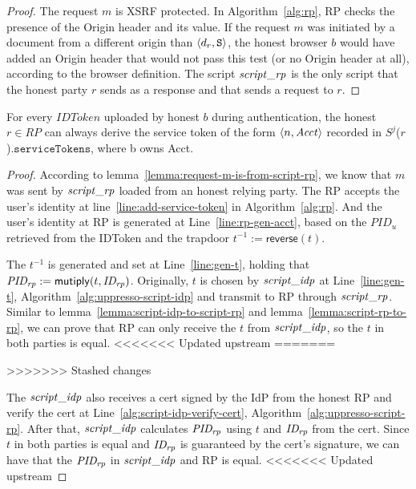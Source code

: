\begin{theorem}
  \begin{proof}
    The request $m$ is XSRF protected. In Algorithm~\ref{alg:rp}, 
    RP checks the presence of the Origin header and its value. 
    If the request $m$ was initiated by a document from a 
    different origin than $\langle d_r, \mathtt{S}\rangle$, the honest browser 
    $b$ would have added an Origin header that would not 
    pass this test (or no Origin header at all), according to 
    the browser definition. The script $\mathit{script\_rp}$ is the 
    only script that the honest party $r$ sends as a response 
    and that sends a request to $r$.
  \end{proof}
  
  \begin{lemma}
    For every $IDToken$ uploaded by honest $b$ during authentication, 
    the honest $r \in RP$ can always derive the service token of the form 
    $\langle {{}n, \mathit{Acct}} \rangle$ recorded in $S^j$($r$).$\mathtt{serviceTokens}$, where b owns Acct. 
  \end{lemma}
  \begin{proof}
    According to lemma~\ref{lemma:request-m-is-from-script-rp}, 
    we know that $m$ was sent by $\mathit{script\_rp}$ loaded from an honest relying party. 
    The RP accepts the user's identity at line~\ref{line:add-service-token} in Algorithm~\ref{alg:rp}.
    And the user's identity at RP is generated at Line~\ref{line:rp-gen-acct}, 
    based on the $PID_u$ retrieved from the IDToken and the trapdoor $t^{-1} := \mathsf{reverse}(t)$. 
    
    The $t^{-1}$ is generated and set at Line~\ref{line:gen-t}, 
    holding that $\mathit{PID_{rp}} := \mathsf{mutiply}(t, \mathit{ID_{rp}})$.
    Originally, $t$ is chosen by $\mathit{script\_idp}$ at Line~\ref{line:gen-t}, Algorithm~\ref{alg:uppresso-script-idp} 
    and transmit to RP through $\mathit{script\_rp}$.
    Similar to lemma~\ref{lemma:script-idp-to-script-rp} and lemma~\ref{lemma:script-rp-to-rp}, 
    we can prove that RP can only receive the $t$ from $\mathit{script\_idp}$, so the $t$ in both parties is equal.
<<<<<<< Updated upstream
=======

>>>>>>> Stashed changes

    The $\mathit{script\_idp}$ also receives a cert signed by the IdP from the honest RP and verify the cert at Line~\ref{alg:script-idp-verify-cert}, Algorithm~\ref{alg:uppresso-script-rp}.
    After that, $\mathit{script\_idp}$ calculates $\mathit{PID_{rp}}$ using $t$ and $\mathit{ID_{rp}}$ from the cert.
    Since $t$ in both parties is equal and $\mathit{ID_{rp}}$ is guaranteed by the cert's signature, 
    we can have that the $\mathit{PID_{rp}}$ in $\mathit{script\_idp}$ and RP is equal.
<<<<<<< Updated upstream


\end{proof}
\end{theorem}
